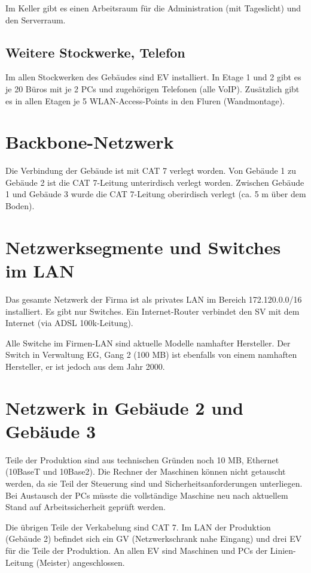 \documentclass[a4paper,10pt]{scrreprt}
\begin{document}
Im Keller gibt es einen Arbeitsraum für die Administration (mit Tageslicht) und den Serverraum.

\subsection{Weitere Stockwerke, Telefon}
Im allen Stockwerken des Gebäudes sind EV installiert. In Etage 1 und 2 gibt es je 20 Büros mit je 2 PCs und zugehörigen Telefonen (alle VoIP). Zusätzlich gibt es in allen Etagen je 5 WLAN-Access-Points in den Fluren (Wandmontage).


\section{Backbone-Netzwerk}
Die Verbindung der Gebäude ist mit CAT 7 verlegt worden. Von Gebäude 1 zu Gebäude 2 ist die CAT 7-Leitung unterirdisch  verlegt worden. Zwischen Gebäude 1 und Gebäude 3 wurde die CAT 7-Leitung oberirdisch verlegt (ca. 5 m über dem Boden).

\section{Netzwerksegmente und Switches im LAN}
Das gesamte Netzwerk der Firma ist als privates LAN im Bereich 172.120.0.0/16 installiert. Es gibt nur Switches. Ein Internet-Router verbindet den SV mit dem Internet (via ADSL 100k-Leitung).

Alle Switche im Firmen-LAN sind aktuelle Modelle namhafter Hersteller. Der Switch in Verwaltung EG, Gang 2 (100 MB) ist ebenfalls von einem namhaften Hersteller, er ist jedoch aus dem Jahr 2000.

\section{Netzwerk in Gebäude 2 und Gebäude 3}
Teile der Produktion sind aus technischen Gründen noch 10 MB, Ethernet (10BaseT und 10Base2). Die Rechner der Maschinen können nicht getauscht werden, da sie Teil der Steuerung sind und Sicherheitsanforderungen unterliegen. Bei Austausch der PCs müsste die vollständige Maschine neu nach aktuellem Stand auf Arbeitssicherheit geprüft werden.

Die übrigen Teile der Verkabelung sind CAT 7. Im LAN der Produktion (Gebäude 2) befindet sich ein GV (Netzwerkschrank nahe Eingang) und drei EV für die Teile der Produktion. An allen EV sind Maschinen und PCs der Linien-Leitung (Meister) angeschlossen.
\end{document}
